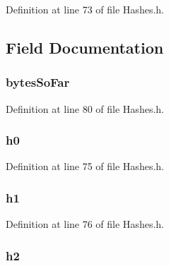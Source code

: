 Definition at line 73 of file Hashes.\+h.



\subsection{Field Documentation}
\hypertarget{struct_h_a_s_h___s_u_m_afa779dd0c79f91156c8783724c01d424}{}
\subsubsection[{bytes\+So\+Far}]{ bytes\+So\+Far}\label{struct_h_a_s_h___s_u_m_afa779dd0c79f91156c8783724c01d424}


Definition at line 80 of file Hashes.\+h.

\hypertarget{struct_h_a_s_h___s_u_m_abbdac33492375285e49e7a6a91d81abc}{}
\subsubsection[{h0}]{ h0}\label{struct_h_a_s_h___s_u_m_abbdac33492375285e49e7a6a91d81abc}


Definition at line 75 of file Hashes.\+h.

\hypertarget{struct_h_a_s_h___s_u_m_afd608f55e737ffc17da3898786d48ee4}{}
\subsubsection[{h1}]{ h1}\label{struct_h_a_s_h___s_u_m_afd608f55e737ffc17da3898786d48ee4}


Definition at line 76 of file Hashes.\+h.

\hypertarget{struct_h_a_s_h___s_u_m_a3b3ad813aad409a63b24049ad357e2d6}{}
\subsubsection[{h2}]{ h2}\label{struct_h_a_s_h___s_u_m_a3b3ad813aad409a63b24049ad357e2d6}


